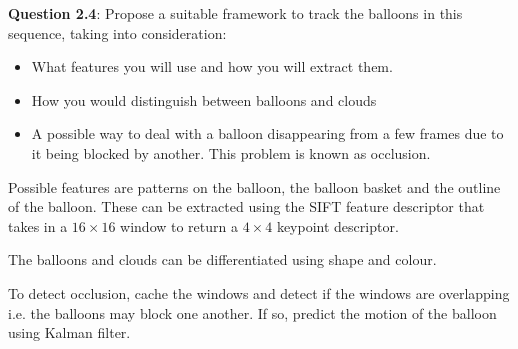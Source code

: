 \documentclass{article}
\begin{document}
    \textbf{Question 2.4}: Propose a suitable framework to track the balloons in this sequence, taking into
    consideration:
    \begin{itemize}
        \item What features you will use and how you will extract them.
        \item How you would distinguish between balloons and clouds
        \item A possible way to deal with a balloon disappearing from a few
        frames due to it being blocked by another. This problem is
        known as occlusion.
    \end{itemize}

    Possible features are patterns on the balloon, the balloon basket and the
    outline of the balloon. These can be extracted using the SIFT feature
    descriptor that takes in a $16 \times 16$ window to return a $4 \times 4$
    keypoint descriptor. 

    The balloons and clouds can be differentiated using shape and colour.

    To detect occlusion, cache the windows and detect if the windows are
    overlapping i.e. the balloons may block one another. If so, predict the
    motion of the balloon using Kalman filter. 
\end{document}
